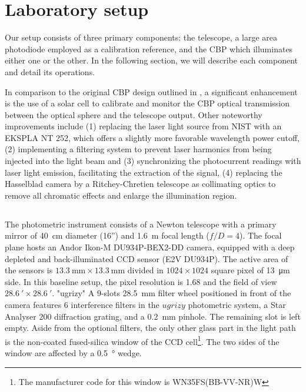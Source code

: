 \section{Laboratory setup}
\label{sec:setup}

Our setup consists of three primary components: the \SD telescope, a large area photodiode employed as a calibration reference, and the CBP
which illuminates either one or the other. In the following section, we will describe each component and detail its operations.

In comparison to the original CBP design outlined in \cite{Mondrik_2023}, a significant enhancement is the use of a solar cell to calibrate and monitor the CBP optical transmission between the optical sphere and the telescope output. Other noteworthy improvements include (1) replacing the laser light source from NIST with an EKSPLA NT 252, which offers a slightly more favorable wavelength power cutoff, (2) implementing a filtering system to prevent laser harmonics from being injected into the light beam and (3) synchronizing the photocurrent readings with laser light emission, facilitating the extraction of the signal, (4) replacing the Hasselblad camera by a Ritchey-Chretien telescope as collimating optics to remove all chromatic effects and enlarge the illumination region.	

\subsection{\SD}
\label{sec:stardice}

The \SD photometric instrument consists of a Newton telescope with a primary mirror of \SI{40}{\centi\meter} diameter (16'') and \SI{1.6}{\meter} focal length ($f/D = 4$). The focal plane hosts an Andor Ikon-M DU934P-BEX2-DD camera, equipped with a deep depleted and back-illuminated CCD sensor (E2V DU934P). The active area of the sensors is $\SI{13.3}{\milli\meter}\times\SI{13.3}{\milli\meter}$ divided in $1024\times 1024$ square pixel of \SI{13}{\micro\meter} side. In this baseline setup, the pixel resolution is \SI{1.68}{\arcsec} and the field of view $\SI{28.6}{\arcmin}\times\SI{28.6}{\arcmin}$.
"ugrizy"
A 9-slots \SI{28.5}{\milli\meter} filter wheel positioned in front of the camera features 6 interference filters in the $ugrizy$ photometric system, a Star Analyser 200 diffraction grating, and a \SI{0.2}{\milli\meter} pinhole. The remaining slot is left empty. Aside from the optional filters, the only other glass part in the light path is the non-coated fused-silica window of the CCD cell\footnote{The manufacturer code for this window is WN35FS(BB-VV-NR)W}. The two sides of the window are affected by a \SI{0.5}{\degree} wedge.

